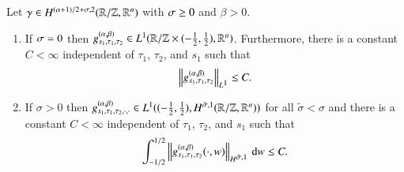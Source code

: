 \begin{lemma}\label{lem:basicEstimate}
 Let $\gamma \in\W[(\alpha+1)/2+\s,2] (\mathbb R / \mathbb Z, \mathbb R^n)$ with $\s\ge0$ and $\beta>0$.
\begin{enumerate}
 \item If $\s=0$ then $g^{(\a,\beta)}_{s_1, \tau_1, \tau_2} \in L^1(\R/\Z\times(-\tfrac12,\tfrac12),\R^n)$.
  Furthermore, there is a constant $C<\infty$
  independent of $\tau_1$, $\tau_2$, and $s_1$ such that
  \[ \norm{g^{(\a,\beta)}_{s_1, \tau_1, \tau_2}}_{\Lp[1]}\le C. \]
 \item If $\sigma> 0$ then $g^{(\a,\beta)}_{s_1, \tau_1, \tau_2,\cdot,\cdot} \in L^1((-\tfrac12,\tfrac12),H^{ \tilde \sigma,1}(\R/\Z,\R^n))$
 for all $\tilde \sigma < \sigma$
  and there is a constant $C<\infty$
  independent of $\tau_1$, $\tau_2$, and $s_1$ such that
  \[ \int_{-1/2}^{1/2}\norm{g^{(\a,\beta)}_{s_1, \tau_1, \tau_2}(\cdot,w)}_{\W[\tilde\sigma,1]}\d w \le C. \]
\end{enumerate}
\end{lemma}

